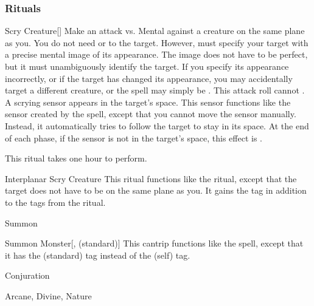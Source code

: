 \subsubsection{Rituals}


\lowercase{\hypertarget{spell:Scry Creature}{}}\label{spell:Scry Creature}
\begin{ability}[\nth{4}]{\hypertarget{spell:Scry Creature}{Scry Creature}}[]
Make an attack vs. Mental against a creature on the same plane as you.
You do not need  or  to the target.
However,  must specify your target with a precise mental image of its appearance.
The image does not have to be perfect, but it must unambiguously identify the target.
If you specify its appearance incorrectly, or if the target has changed its appearance, you may accidentally target a different creature, or the spell may simply be .
This attack roll cannot .
\hit A scrying sensor appears in the target's space.
This sensor functions like the sensor created by the  spell, except that you cannot move the sensor manually.
Instead, it automatically tries to follow the target to stay in its space.
At the end of each phase, if the sensor is not in the target's space, this effect is .

This ritual takes one hour to perform.
\end{ability}
\vspace{0.25em}



\lowercase{\hypertarget{spell:Interplanar Scry Creature}{}}\label{spell:Interplanar Scry Creature}
\begin{ability}[\nth{7}]{\hypertarget{spell:Interplanar Scry Creature}{Interplanar Scry Creature}}
This ritual functions like the  ritual, except that the target does not have to be on the same plane as you.
It gains the  tag in addition to the tags from the  ritual.
\end{ability}
\vspace{0.25em}


\newpage
\begin{spellsection}{Summon}

\begin{spellheader}
\end{spellheader}


\begin{ability}{Summon Monster}[,  (standard)]
This cantrip functions like the  spell, except that it has the  (standard) tag instead of the  (self) tag.
\end{ability}




 Conjuration

 Arcane, Divine, Nature
\end{spellsection}


